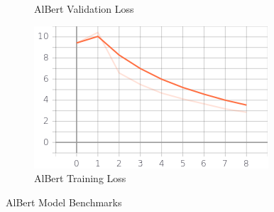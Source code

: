 \documentclass[a4paper,12pt]{report}
\begin{document}
\begin{figure}
\begin{subfigure}[b]{0.475\textwidth}
    		\caption{\small AlBert Validation Loss}  
    		\label{albertValLoss}
    	\end{subfigure}
    	\hfill
    	\begin{subfigure}[b]{0.475\textwidth}   
    		\centering 
    		\includegraphics[width=\textwidth]{../images/Albert_Train_Loss.png}
    		\caption{\small AlBert Training Loss}
    		\label{albertTrainLoss}
    	\end{subfigure}
    	\caption{AlBert Model Benchmarks} 
    	\label{albertBenchmarks}
    \end{figure}
\end{document}
